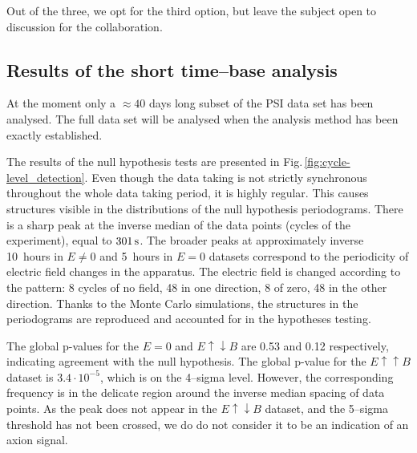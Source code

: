 Out of the three, we opt for the third option, but leave the subject open to discussion for the collaboration.


\subsection{Results of the short time--base analysis}
At the moment only a $\approx 40$ days long subset of the PSI data set has been analysed. The full data set will be analysed when the analysis method has been exactly established.

The results of the null hypothesis tests are presented in Fig.\,\ref{fig:cycle-level_detection}. Even though the data taking is not strictly synchronous throughout the whole data taking period, it is highly regular. This causes structures visible in the distributions of the null hypothesis periodograms. There is a sharp peak at the inverse median of the data points (cycles of the experiment), equal to $\unit[301]{s}$. The broader peaks at approximately inverse 10~hours in $E \neq 0$ and 5~hours in $E = 0$ datasets correspond to the periodicity of electric field changes in the apparatus. The electric field is changed according to the pattern: 8 cycles of no field, 48 in one direction, 8 of zero, 48 in the other direction. Thanks to the Monte Carlo simulations, the structures in the periodograms are reproduced and accounted for in the hypotheses testing.

The global p-values for the $E=0$ and $E \uparrow \downarrow B$ are 0.53 and 0.12 respectively, indicating agreement with the null hypothesis. The global p-value for the $E \uparrow \uparrow B$ dataset is $3.4 \cdot 10^{-5}$, which is on the 4--sigma level. However, the corresponding frequency is in the delicate region around the inverse median spacing of data points. As the peak does not appear in the $E \uparrow \downarrow B$ dataset, and the 5--sigma threshold has not been crossed, we do do not consider it to be an indication of an axion signal.


